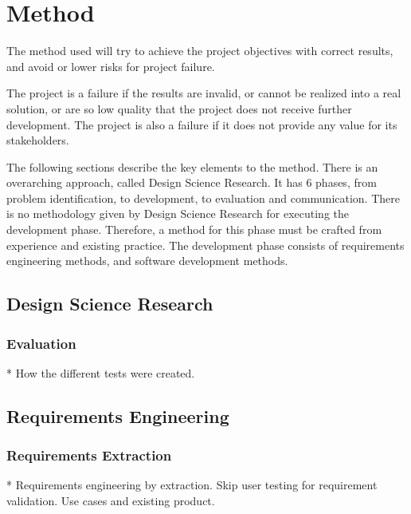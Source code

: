 \chapter{Method}\label{chap:method}

The method used will try to achieve the project objectives with correct results, and avoid or lower risks for project failure.


The project is a failure if the results are invalid, or cannot be realized into a real solution, or are so low quality that the project does not receive further development.
The project is also a failure if it does not provide any value for its stakeholders.


The following sections describe the key elements to the method.
There is an overarching approach, called Design Science Research.
It has 6 phases, from problem identification, to development, to evaluation and communication.
There is no methodology given by Design Science Research for executing the development phase.
Therefore, a method for this phase must be crafted from experience and existing practice.
The development phase consists of requirements engineering methods, and software development methods.


\section{Design Science Research}



\subsection{Evaluation}

* How the different tests were created.

\section{Requirements Engineering}

\subsection{Requirements Extraction}

* Requirements engineering by extraction. Skip user testing for requirement validation. Use cases and existing product.

